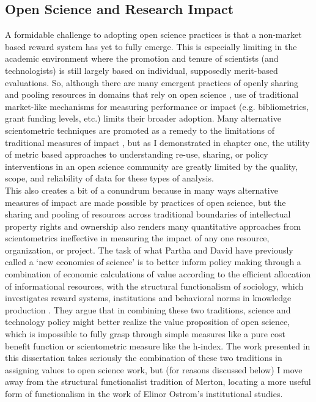 \documentclass[thesis,tocnosub,noragright,centerchapter,12pt]{uiucecethesis09}
\begin{document}
\subsection*{Open Science and Research Impact}

A formidable challenge to adopting open science practices is that a non-market based reward system has yet to fully emerge. This is especially limiting in the academic environment where the promotion and tenure of scientists (and technologists) is still largely based on individual, supposedly merit-based evaluations. So, although there are
many emergent practices of openly sharing and pooling resources in domains that rely on open
science \citep{willinsky2005unacknowledged, stodden2010open},
use of traditional market-like mechanisms for measuring performance or impact (e.g. bibliometrics, grant funding levels, etc.) limits their broader adoption.  Many
alternative scientometric techniques are promoted as a
remedy to the limitations of traditional measures of impact \citep{bollen2005toward, priem2012altmetrics, piwowar2013altmetrics }, but as I demonstrated in chapter one,
the utility of metric based approaches to understanding re-use,
sharing, or policy interventions in an open science community are
greatly limited by the quality, scope, and reliability of data for these
types of analysis.\\

This also creates a bit of a conundrum because in many ways alternative measures of impact are made possible by practices of open science, but the sharing and pooling of resources across traditional boundaries of intellectual
property rights and ownership also renders many quantitative
approaches from scientometrics ineffective in measuring the impact of
any one resource, organization, or project. The task of what Partha and David have previously called a `new economics of science' is to better inform policy making through a combination of economic calculations of value according to the efficient allocation of informational resources, with the structural functionalism of sociology, which investigates reward systems, institutions and behavioral norms in knowledge production \citeyearpar[p. 487]{partha1994toward}. They argue that in combining these two traditions, science and technology policy might better realize the value proposition of open science, which is impossible to fully grasp through simple measures like a pure cost benefit function or scientometric measure like the h-index. The work presented in this dissertation takes seriously the combination of these two traditions in assigning values to open science work, but (for reasons discussed below) I move away from the structural functionalist tradition of Merton, locating a more useful form of functionalism in the work of Elinor Ostrom's institutional studies. 
\end{document}
